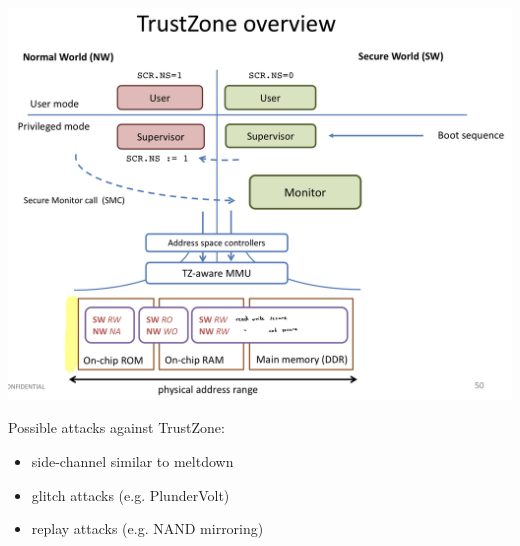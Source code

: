 \begin{center}
    \includegraphics[width=0.8\linewidth]{images/mobile_sec_TrustZoneOverview.png}
\end{center}

Possible attacks against TrustZone: \vspace{-1.5mm}
\begin{itemize}
    \item side-channel similar to meltdown
    \item glitch attacks (e.g. PlunderVolt)
    \item replay attacks (e.g. NAND mirroring)
\end{itemize}
